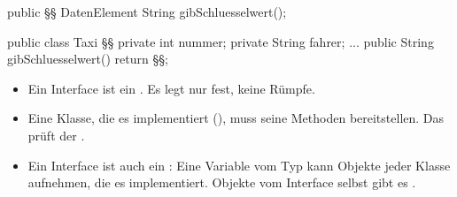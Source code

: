 \documentclass[11pt,a4paper]{article}
\begin{document}
\begin{minipage}[t]{0.47\linewidth}
\vspace{0pt}
\begin{java}[basicstyle=\ttfamily\footnotesize]
public §§ DatenElement {
   String gibSchluesselwert();
}

public class Taxi §§ {
   private int nummer;
   private String fahrer;
   ...
   public String gibSchluesselwert() {
      return §§;
   }
}
\end{java}
\end{minipage}\hfill
\begin{minipage}[t]{0.505\linewidth}
\vspace{0pt}
\begin{merke}[Interface]
\small
\begin{itemize}
\item Ein Interface ist ein . Es legt nur  fest, keine Rümpfe.
\item Eine Klasse, die es implementiert (), muss  seine Methoden bereitstellen. Das prüft der .
\item Ein Interface ist auch ein : Eine Variable vom Typ  kann Objekte jeder Klasse aufnehmen, die es implementiert. Objekte vom Interface selbst gibt es .
\end{itemize}
\end{merke}
\end{minipage}
\end{document}
